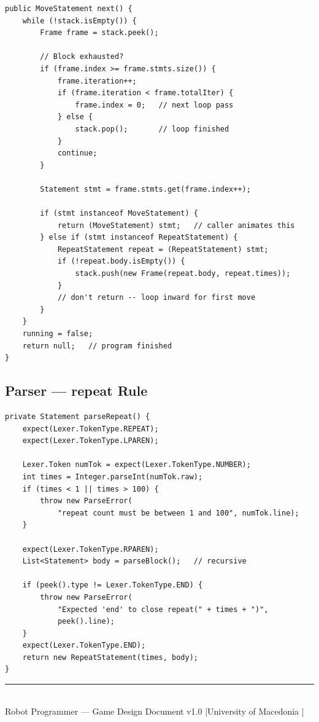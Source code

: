\documentclass[12pt,a4paper]{article}
\begin{document}
\begin{tcolorbox}[codebox, title={Interpreter.java — next()}]
\begin{lstlisting}[style=java]
public MoveStatement next() {
    while (!stack.isEmpty()) {
        Frame frame = stack.peek();

        // Block exhausted?
        if (frame.index >= frame.stmts.size()) {
            frame.iteration++;
            if (frame.iteration < frame.totalIter) {
                frame.index = 0;   // next loop pass
            } else {
                stack.pop();       // loop finished
            }
            continue;
        }

        Statement stmt = frame.stmts.get(frame.index++);

        if (stmt instanceof MoveStatement) {
            return (MoveStatement) stmt;   // caller animates this
        } else if (stmt instanceof RepeatStatement) {
            RepeatStatement repeat = (RepeatStatement) stmt;
            if (!repeat.body.isEmpty()) {
                stack.push(new Frame(repeat.body, repeat.times));
            }
            // don't return -- loop inward for first move
        }
    }
    running = false;
    return null;   // program finished
}
\end{lstlisting}
\end{tcolorbox}

\subsection{Parser — repeat Rule}

\begin{tcolorbox}[codebox, title={Parser.java — parseRepeat()}]
\begin{lstlisting}[style=java]
private Statement parseRepeat() {
    expect(Lexer.TokenType.REPEAT);
    expect(Lexer.TokenType.LPAREN);

    Lexer.Token numTok = expect(Lexer.TokenType.NUMBER);
    int times = Integer.parseInt(numTok.raw);
    if (times < 1 || times > 100) {
        throw new ParseError(
            "repeat count must be between 1 and 100", numTok.line);
    }

    expect(Lexer.TokenType.RPAREN);
    List<Statement> body = parseBlock();   // recursive

    if (peek().type != Lexer.TokenType.END) {
        throw new ParseError(
            "Expected 'end' to close repeat(" + times + ")",
            peek().line);
    }
    expect(Lexer.TokenType.END);
    return new RepeatStatement(times, body);
}
\end{lstlisting}
\end{tcolorbox}

\vfill
\begin{center}
  \color{primary!50}\rule{0.8\linewidth}{0.4pt}\\[4pt]
  {\sffamily\small Robot Programmer — Game Design Document v1.0 \quad|\quad University of Macedonia \quad|}
\end{center}
\end{document}

